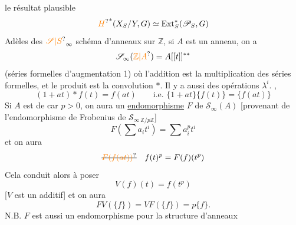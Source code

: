 {} le résultat plausible
\[
{\unsure{H}}^*(X_S/Y,G)\simeq\operatorname{Ext}_S^*(\mathscr{P}_S,G)
\]
Adèles des {}
${\unsure{\mathscr{S}|S}}_\infty$ schéma d'anneaux  sur $\mathbb{Z}$, si $A$ est un anneau, on a
\[
\mathscr{S}_\infty({\unsure{\mathbb{Z}|A}})=A[[t]]^{**}
\]
(séries formelles d'augmentation 1) où l'addition est la multiplication des séries formelles, et le produit est la convolution $*$. Il y a aussi des opérations $\lambda^i$. {},
\[
(1+at)*f(t)=f(at)\qquad\text{i.e. }\{1+at\}\{f(t)\}=\{f(at)\}
\]
Si $A$ est de car $p>0$, on aura un \uline{endomorphisme} $F$ de $\mathscr{S}_\infty(A)$ [provenant de l'endomorphisme de Frobenius de $\mathscr{S}_{\infty\,\mathbb{Z}/p\mathbb{Z}}$]
\[
F\left(\sum a_it^i\right)=\sum a_i^pt^i
\]
et on aura
\[
\deleted{{\unsure{F(f(at))}}}\quad f(t)^p=F(f)(t^p)
\]
Cela conduit alors à poser
\[
V(f)(t)=f(t^p)
\]
[$V$ est un {} additif] et on aura
\[
FV(\{f\})=VF(\{f\})=p\{f\}.
\]
N.B. $F$ est aussi un endomorphisme pour la structure d'anneaux

